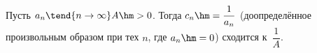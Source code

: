 
Пусть $a_n\tend{n\to \infty}A\hm>0$. Тогда $c_n\hm=\dfrac1{a_n}$ (доопределённое произвольным образом при тех $n$, где $a_n\hm=0$) сходится к~$\dfrac1A$.
